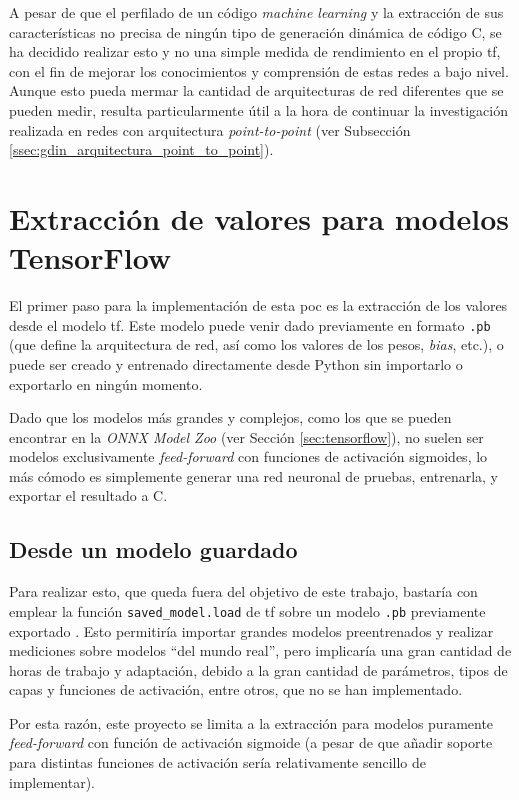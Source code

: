 A pesar de que el perfilado de un código \textit{machine learning} y la extracción de sus características no precisa de ningún tipo de generación dinámica de código C, se ha decidido realizar esto y no una simple medida de rendimiento en el propio \acrlong{tf}, con el fin de mejorar los conocimientos y comprensión de estas redes a bajo nivel. Aunque esto pueda mermar la cantidad de arquitecturas de red diferentes que se pueden medir, resulta particularmente útil a la hora de continuar la investigación realizada en redes con arquitectura \textit{point-to-point} (ver Subsección \ref{ssec:gdin_arquitectura_point_to_point}). 

\section{Extracción de valores para modelos TensorFlow}
\label{sec:extraccion_valores_modelo_tf}
El primer paso para la implementación de esta \acrshort{poc} es la extracción de los valores desde el modelo \acrlong{tf}. Este modelo puede venir dado previamente en formato \texttt{.pb} (que define la arquitectura de red, así como los valores de los pesos, \textit{bias}, etc.), o puede ser creado y entrenado directamente desde Python sin importarlo o exportarlo en ningún momento.

Dado que los modelos más grandes y complejos, como los que se pueden encontrar en la \textit{ONNX Model Zoo} (ver Sección \ref{sec:tensorflow}), no suelen ser modelos exclusivamente \textit{feed-forward} con funciones de activación sigmoides, lo más cómodo es simplemente generar una red neuronal de pruebas, entrenarla, y exportar el resultado a C.

\subsection{Desde un modelo guardado}
\label{ssec:desde_modelo_guardado}
Para realizar esto, que queda fuera del objetivo de este trabajo, bastaría con emplear la función \texttt{saved\_model.load} de \acrlong{tf} sobre un modelo \texttt{.pb} previamente exportado \cite{tensorflow_saved_model}. Esto permitiría importar grandes modelos preentrenados y realizar mediciones sobre modelos ``del mundo real'', pero implicaría una gran cantidad de horas de trabajo y adaptación, debido a la gran cantidad de parámetros, tipos de capas y funciones de activación, entre otros, que no se han implementado.

Por esta razón, este proyecto se limita a la extracción para modelos puramente \textit{feed-forward} con función de activación sigmoide (a pesar de que añadir soporte para distintas funciones de activación sería relativamente sencillo de implementar).

